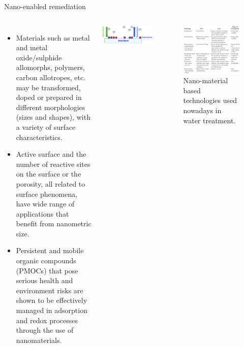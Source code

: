\documentclass[11pt,dvipsnames,ignorenonframetext,aspectratio=169]{beamer}
\providecommand{\tightlist}{%
  \setlength{\itemsep}{0pt}\setlength{\parskip}{0pt}}
\newcommand{\bcolumns}{\begin{columns}[T, onlytextwidth]}
\newcommand{\ecolumns}{\end{columns}}
\begin{document}
\begin{frame}{Nano-enabled remediation}
\protect\hypertarget{nano-enabled-remediation}{}
\bcolumns
{}
\footnotesize

\begin{itemize}
\tightlist
\item
  Materials such as metal and metal oxide/sulphide allomorphs, polymers,
  carbon allotropes, etc. may be transformed, doped or prepared in
  different morphologies (sizes and shapes), with a variety of surface
  characteristics.
\item
  Active surface and the number of reactive sites on the surface or the
  porosity, all related to surface phenomena, have wide range of
  applications that benefit from nanometric size.
\item
  Persistent and mobile organic compounds (PMOCs) that pose serious
  health and environment risks are shown to be effectively managed in
  adsorption and redox processes through the use of nanomaterials.
\end{itemize}

\begin{center}\includegraphics[width=0.55\linewidth]{../images/environmental_remediation_nanoparticles} \end{center}


\begin{figure}
\includegraphics[width=0.88\linewidth]{../images/nano_technology_solution_water} \caption{Nano-material based technologies used nowadays in water treatment.}\label{fig:nano-technology-water}
\end{figure}

\ecolumns
\end{frame}
\end{document}
